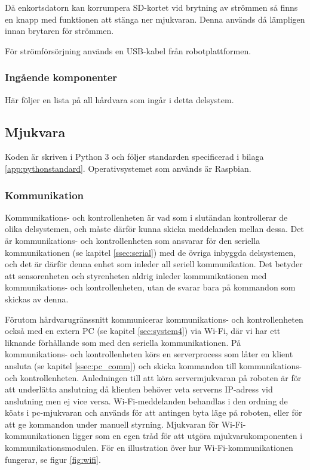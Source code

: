\documentclass[a4paper,11pt]{article}
\begin{document}
Då enkortsdatorn kan korrumpera SD-kortet vid brytning av strömmen så finns en knapp med funktionen att stänga ner mjukvaran. Denna används då lämpligen innan brytaren för strömmen.

För strömförsörjning används en USB-kabel från robotplattformen.

\subsubsection{Ingående komponenter}
Här följer en lista på all hårdvara som ingår i detta delsystem.

\begin{HardwareList}
\end{HardwareList}

\subsection{Mjukvara}
Koden är skriven i Python 3 och följer standarden specificerad i bilaga \ref{app:pythonstandard}. Operativsystemet som används är Raspbian.

\subsubsection{Kommunikation}\label{ssec:brain_comm}
Kommunikations- och kontrollenheten är vad som i slutändan kontrollerar de olika delsystemen, och måste därför kunna skicka meddelanden mellan dessa. Det är kommunikations- och kontrollenheten som ansvarar för den seriella kommunikationen (se kapitel \ref{ssec:serial}) med de övriga inbyggda delsystemen, och det är därför denna enhet som inleder all seriell kommunikation. Det betyder att sensorenheten och styrenheten aldrig inleder kommunikationen med kommunikations- och kontrollenheten, utan de svarar bara på kommandon som skickas av denna.

Förutom hårdvarugränssnitt kommunicerar  kommunikations- och kontrollenheten också med en extern PC (se kapitel \ref{sec:system4}) via Wi-Fi, där vi har ett liknande förhållande som med den seriella kommunikationen. På kommunikations- och kontrollenheten körs en serverprocess som låter en klient ansluta (se kapitel \ref{ssec:pc_comm}) och skicka kommandon till kommunikations- och kontrollenheten. Anledningen till att köra servermjukvaran på roboten är för att underlätta anslutning då klienten behöver veta serverns IP-adress vid anslutning men ej vice versa. Wi-Fi-meddelanden behandlas i den ordning de köats i pc-mjukvaran och används för att antingen byta läge på roboten, eller för att ge kommandon under manuell styrning. Mjukvaran för Wi-Fi-kommunikationen ligger som en egen tråd för att utgöra mjukvarukomponenten i kommunikationsmodulen. För en illustration över hur Wi-Fi-kommunikationen fungerar, se figur \ref{fig:wifi}.
\end{document}
